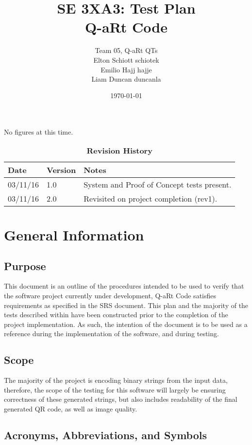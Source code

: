 \documentclass[12pt, titlepage]{article}
\title{SE 3XA3: Test Plan\\Q-aRt Code}
\author{Team 05, Q-aRt QTs
		\\ Elton Schiott schiotek
		\\ Emilio Hajj hajje
		\\ Liam Duncan duncanla
}
\date{\today}
\begin{document}
\maketitle

\tableofcontents
\listoftables
\listoffigures

No figures at this time.

\begin{table}[bp]
\caption{\bf Revision History}
\begin{tabularx}{\textwidth}{p{3cm}p{2cm}X}
\toprule {\bf Date} & {\bf Version} & {\bf Notes}\\
\midrule
03/11/16 & 1.0 & System and Proof of Concept tests present.\\

03/11/16 & 2.0 & Revisited on project completion (rev1).\\
\bottomrule
\end{tabularx}
\end{table}

\newpage


\section{General Information}

\subsection{Purpose}
	This document is an outline of the procedures intended to be used to verify 
	that the software project currently under development, Q-aRt Code satisfies 
	requirements as specified in the SRS document. This plan and the majority 
	of the tests described within have been constructed prior to the completion 
	of the project implementation. As such, the intention of the document is to 
	be used as a reference during the implementation of the software, and 
	during testing.
\subsection{Scope}
	The majority of the project is encoding binary strings from the input data, 
	therefore, the scope of the testing for this software will largely be 
	ensuring correctness of these generated strings, but also includes 
	readability of the final generated QR code, as well as image quality.
\subsection{Acronyms, Abbreviations, and Symbols}
	
\end{document}
